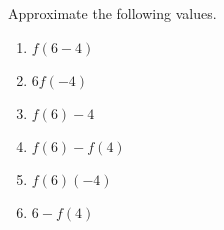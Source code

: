 \documentclass{ximera}
\begin{document}
\begin{exercise}
\begin{question}
\end{question}









\begin{question}  Approximate the following values. \\

\begin{enumerate}
  \item $f(6 - 4)$ 
  \item $6 f(-4)$
  \item $f(6) - 4$
  \item $f(6) - f(4)$
  \item $f(6)(-4)$
  \item $6 - f(4)$
\end{enumerate}

\end{question}









\end{exercise}
\end{document}
